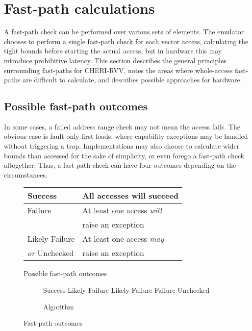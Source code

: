 \section{Fast-path calculations\label{chap:hardware:sec:fastpath}}
A fast-path check can be performed over various sets of elements.
The emulator chooses to perform a single fast-path check for each vector access, calculating the tight bounds before starting the actual access, but in hardware this may introduce prohibitive latency.
This section describes the general principles surrounding fast-paths for CHERI-RVV, notes the areas where whole-access fast-paths are difficult to calculate, and describes possible approaches for hardware.

\subsection{Possible fast-path outcomes}
In some cases, a failed address range check may not mean the access fails.
The obvious case is fault-only-first loads, where capability exceptions may be handled without triggering a trap.
Implementations may also choose to calculate wider bounds than accessed for the sake of simplicity, or even forego a fast-path check altogether.
Thus, a fast-path check can have four outcomes depending on the circumstances.

\begin{figure}[t]
\begin{subtable}{0.5\textwidth}
    \begin{tabular}{ll}
        \toprule
        Success & All accesses will succeed \\
        \midrule
        Failure & At least one access \emph{will}\\& raise an exception \\
        \midrule
        Likely-Failure & At least one access \emph{may} \\
        \emph{or} Unchecked & raise an exception \\
        \bottomrule
    \end{tabular}
    \caption{Possible fast-path outcomes}
\end{subtable}%
\hfill%
\begin{subfigure}{0.45\textwidth}
    \begin{algorithmic}
                \State Success
                \State Likely-Failure
                \State Likely-Failure
            \Else{}
                \State Failure
            \EndIf{}
        \Else{}
            \State Unchecked
        \EndIf{}
    \end{algorithmic}
    \caption{Algorithm}
\end{subfigure}
\caption{Fast-path outcomes}
\end{figure}

